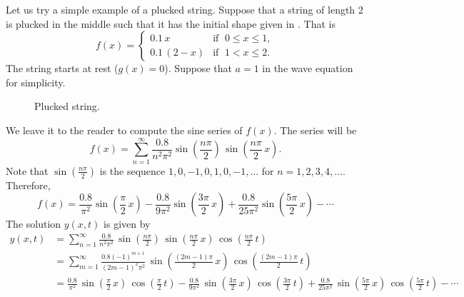 \begin{example}
Let us try a simple example of a plucked string.  Suppose that
a string of length 2
is plucked in the middle such that it has the initial shape given
in .  That is
\begin{equation*}
f(x) = \begin{cases}
0.1\, x & \text{if } \; 0 \leq x \leq 1 , \\
0.1\, (2-x) & \text{if } \; 1 < x \leq 2 .
\end{cases}
\end{equation*}
The string starts at rest ($g(x) =
0$).  Suppose that $a=1$ in the wave
equation for simplicity.

\begin{figure}[h!t]
\capstart
\begin{center}
\caption{Plucked string.\label{wave:pluckedstrfig}}
\end{center}
\end{figure}

We leave it to the reader to compute the sine series of $f(x)$.  The series
will be
\begin{equation*}
f(x) = \sum_{n=1}^\infty
\frac{0.8}{n^2 \pi^2}
\sin \left( \frac{n \pi}{2} \right) \,
\sin \left( \frac{n \pi}{2} \, x \right) .
\end{equation*}
Note that 
$\sin \left( \frac{n \pi}{2} \right)$
is the sequence $1, 0, -1, 0, 1, 0, -1, \ldots$
for $n = 1,2,3,4,\ldots$.  Therefore,
\begin{equation*}
f(x) = 
\frac{0.8}{\pi^2}
\sin \left( \frac{\pi}{2} \, x \right)
-
\frac{0.8}{9 \pi^2}
\sin \left( \frac{3 \pi}{2} \, x \right)
+
\frac{0.8}{25 \pi^2}
\sin \left( \frac{5 \pi}{2} \, x \right)
- \cdots
\end{equation*}
The solution $y(x,t)$ is given by
\begin{equation*}
\begin{split}
y(x,t) & = 
\sum_{n=1}^\infty
\frac{0.8}{n^2 \pi^2} \,
\sin \left( \frac{n \pi}{2} \right) \,
\sin \left( \frac{n \pi}{2} \, x \right) \,
\cos \left( \frac{n \pi}{2} \, t \right)
\\
& = 
\sum_{m=1}^\infty
\frac{0.8 {(-1)}^{m+1}}{{(2m-1)}^2 \pi^2} \,
\sin \left( \frac{(2m-1) \pi}{2} \, x \right) \,
\cos \left( \frac{(2m-1) \pi}{2} \, t \right)
\\
& =
\frac{0.8}{\pi^2} \,
\sin \left( \frac{\pi}{2} \, x \right) \,
\cos \left( \frac{\pi}{2} \, t \right)
-
\frac{0.8}{9 \pi^2} \,
\sin \left( \frac{3 \pi}{2} \, x \right) \,
\cos \left( \frac{3 \pi}{2} \, t \right)
+
\frac{0.8}{25 \pi^2} \,
\sin \left( \frac{5 \pi}{2} \, x \right) \,
\cos \left( \frac{5 \pi}{2} \, t \right) 
- \cdots
\end{split}
\end{equation*}


\end{example}
